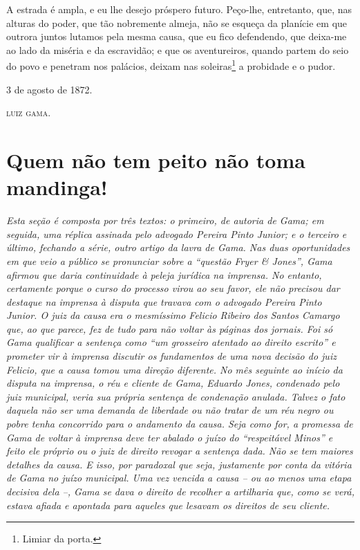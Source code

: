 A estrada é ampla, e eu lhe desejo próspero futuro. Peço-lhe,
entretanto, que, nas alturas do poder, que tão nobremente almeja, não se
esqueça da planície em que outrora juntos lutamos pela mesma causa, que
eu fico defendendo, que deixa-me ao lado da miséria e da escravidão; e
que os aventureiros, quando partem do seio do povo e penetram nos
palácios, deixam nas soleiras\footnote{ Limiar da porta.} a probidade e
o pudor.
\begin{flushright}
3 de agosto de 1872.

\textsc{luiz gama}.
\end{flushright}
\part{Quem não tem peito não toma mandinga!}

\begin{didascalia}
\emph{Esta seção é composta por três textos: o primeiro, de autoria de
Gama; em seguida, uma réplica assinada pelo advogado Pereira Pinto
Junior; e o terceiro e último, fechando a série, outro artigo da lavra
de Gama. Nas duas oportunidades em que veio a público se pronunciar
sobre a ``questão Fryer \& Jones'', Gama afirmou que daria continuidade à
peleja jurídica na imprensa. No entanto, certamente porque o curso do
processo virou ao seu favor, ele não precisou dar destaque na imprensa à
disputa que travava com o advogado Pereira Pinto Junior. O juiz da causa
era o mesmíssimo Felicio Ribeiro dos Santos Camargo que, ao que parece,
fez de tudo para não voltar às páginas dos jornais. Foi só Gama
qualificar a sentença como ``um grosseiro atentado ao direito escrito'' e
prometer vir à imprensa discutir os fundamentos de uma nova decisão do
juiz Felicio, que a causa tomou uma direção diferente. No mês seguinte
ao início da disputa na imprensa, o réu e cliente de Gama, Eduardo
Jones, condenado pelo juiz municipal, veria sua própria sentença de
condenação anulada. Talvez o fato daquela não ser uma demanda de
liberdade ou não tratar de um réu negro ou pobre tenha concorrido para o
andamento da causa. Seja como for, a promessa de Gama de voltar à
imprensa deve ter abalado o juízo do ``respeitável Minos'' e feito ele
próprio ou o juiz de direito revogar a sentença dada. Não se tem maiores
detalhes da causa. E isso, por paradoxal que seja, justamente por conta
da vitória de Gama no juízo municipal. Uma vez vencida a causa -- ou ao
menos uma etapa decisiva dela --, Gama se dava o direito de recolher a
artilharia que, como se verá, estava afiada e apontada para aqueles que
lesavam os direitos de seu cliente.}
\end{didascalia}


